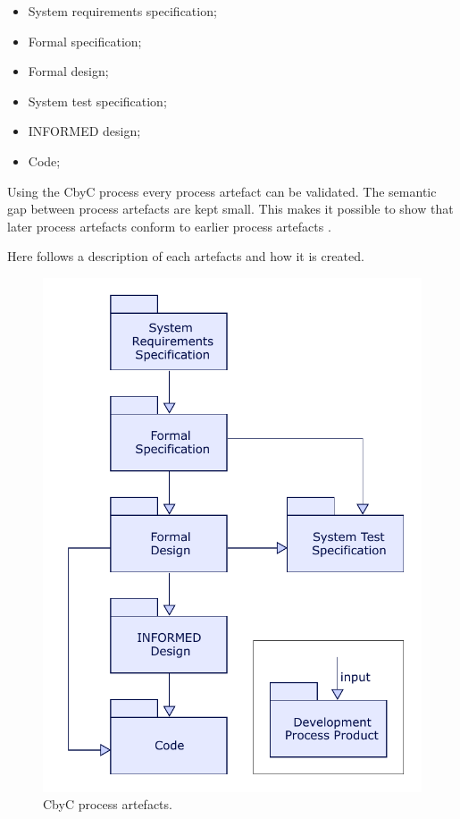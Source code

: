 \begin{itemize}
	\item System requirements specification;
	\item Formal specification;
	\item Formal design;
	\item System test specification;
	\item INFORMED design;
	\item Code;
\end{itemize}

Using the CbyC process every process artefact can be validated. The semantic gap 
between process artefacts are kept small. This makes it possible to show that later 
process artefacts conform to earlier process artefacts \parencite{Tokeneer}.

Here follows a description of each artefacts and how it is created.

\begin{figure}[H]
	\centering
	\includegraphics[scale=0.75]{Figures/CbyC_process.pdf}
	\decoRule
	\caption{CbyC process artefacts.}
	\label{fig:CbyCDev}
\end{figure}

